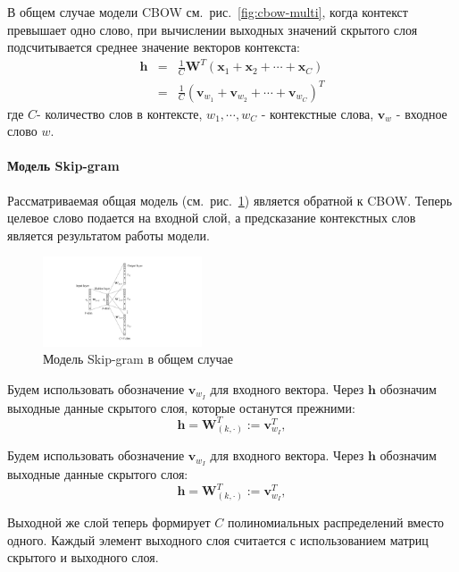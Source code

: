 В общем случае модели CBOW см.~рис.~\ref{fig:cbow-multi}, когда контекст превышает одно слово, при вычислении выходных значений скрытого слоя подсчитывается среднее значение векторов контекста:
\begin{eqnarray}
\mathbf{h} &=& \frac{1}{C}\mathbf{W}^T(\mathbf{x}_1+\mathbf{x}_2+\cdots+\mathbf{x}_C) \\
&=& \frac{1}{C}(\mathbf{v}_{w_1} + \mathbf{v}_{w_2} + \cdots + \mathbf{v}_{w_C})^T
\label{eq:cbow-complex-h}
\end{eqnarray}
где $C$- количество слов в контексте, $w_1, \cdots, w_C$ - контекстные слова, $\mathbf{v}_w$  - входное слово $w$.


\paragraph{Модель Skip-gram}
Рассматриваемая общая модель (см.~рис.~\ref{fig:skip-gram-multi}) является обратной к CBOW. Теперь целевое слово подается на входной слой, а предсказание контекстных слов является результатом работы модели. 
\begin{figure}[ht]
\centering
\includegraphics[width=0.42\textwidth]{img/skip-gram-multi.pdf}
\caption{\label{fig:skip-gram-multi} Модель Skip-gram в общем случае}
\end{figure}
Будем использовать обозначение $\mathbf{v}_{w_I}$ для входного вектора. Через $\mathbf{h}$ обозначим выходные данные скрытого слоя, которые останутся прежними:
\begin{equation}
\mathbf{h} = \mathbf{W}_{(k, \cdot)}^T := \mathbf{v}_{w_I}^T,
\end{equation}


Будем использовать обозначение  $\mathbf{v}_{w_I}$ для входного вектора. Через $\mathbf{h}$ обозначим выходные данные скрытого слоя:
\begin{equation}
\mathbf{h} = \mathbf{W}_{(k, \cdot)}^T := \mathbf{v}_{w_I}^T,
\end{equation}

Выходной же слой теперь формирует $C$ полиномиальных распределений вместо одного. Каждый элемент выходного слоя считается с использованием матриц скрытого и выходного слоя.

